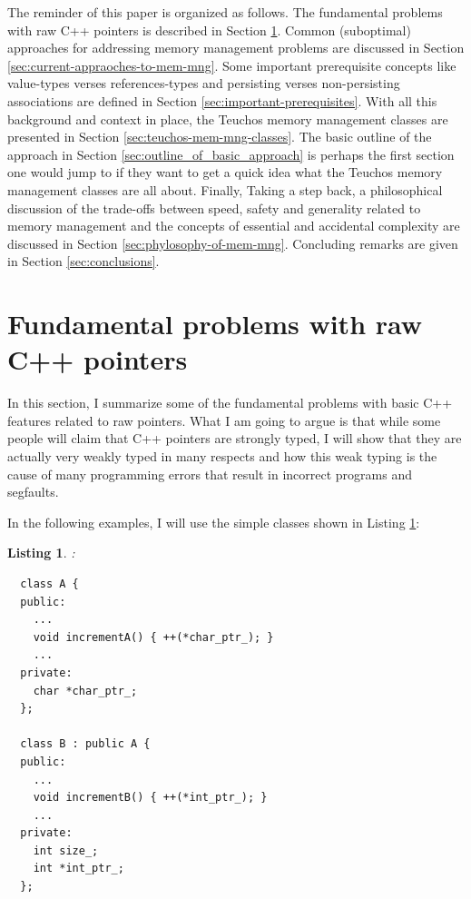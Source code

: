 \documentclass[pdf,ps2pdf,11pt]{SANDreport}
\newtheorem{listing}{Listing}
\begin{document}
The reminder of this paper is organized as follows. The fundamental
problems with raw C++ pointers is described in Section
{}\ref{sec:problems-with-raw-pointers}.  Common (suboptimal)
approaches for addressing memory management problems are discussed in
Section {}\ref{sec:current-appraoches-to-mem-mng}.  Some important
prerequisite concepts like value-types verses references-types and
persisting verses non-persisting associations are defined in Section
{}\ref{sec:important-prerequisites}.  With all this background and
context in place, the Teuchos memory management classes are presented
in Section {}\ref{sec:teuchos-mem-mng-classes}.  The basic outline of
the approach in Section {}\ref{sec:outline_of_basic_approach} is
perhaps the first section one would jump to if they want to get a
quick idea what the Teuchos memory management classes are all about.
Finally, Taking a step back, a philosophical discussion of the
trade-offs between speed, safety and generality related to memory
management and the concepts of essential and accidental complexity are
discussed in Section {}\ref{sec:phylosophy-of-mem-mng}.  Concluding
remarks are given in Section {}\ref{sec:conclusions}.


%
{}\section{Fundamental problems with raw C++ pointers}
\label{sec:problems-with-raw-pointers}
%

In this section, I summarize some of the fundamental problems with
basic C++ features related to raw pointers.  What I am going to argue
is that while some people will claim that C++ pointers are strongly
typed, I will show that they are actually very weakly typed in many
respects and how this weak typing is the cause of many programming
errors that result in incorrect programs and segfaults.

In the following examples, I will use the simple classes shown in
Listing {}\ref{listing:Simple_A_B}:

\begin{listing}:\\
\label{listing:Simple_A_B}
{\small\begin{verbatim}
  class A {
  public:
    ...
    void incrementA() { ++(*char_ptr_); }
    ...
  private:
    char *char_ptr_;
  };

  class B : public A {
  public:
    ...
    void incrementB() { ++(*int_ptr_); }
    ...
  private:
    int size_;
    int *int_ptr_;
  };
\end{verbatim}}
\end{listing}
\end{document}
